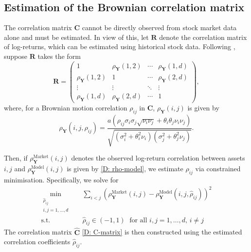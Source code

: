\subsection{Estimation of the Brownian correlation matrix}
The correlation matrix $\mathbf{C}$ cannot be directly observed from stock market data alone and must be estimated. In view of this, let $\mathbf{R}$ denote the correlation matrix of log-returns, which can be estimated using historical stock data. Following \cite{LUCIANO20101937, Luciano02072016}, suppose $\mathbf R$ takes the form
\begin{equation}
    \mathbf{R} =
    \begin{pmatrix}
        1 & \rho_{\mathbf{Y}}(1,2) & \cdots & \rho_{\mathbf{Y}}(1,d) \\
        \rho_{\mathbf{Y}}(1,2) & 1 & \cdots & \rho_{\mathbf{Y}}(2,d) \\
        \vdots & \vdots & \ddots & \vdots \\
        \rho_{\mathbf{Y}}(1,d) & \rho_{\mathbf{Y}}(2,d) & \cdots & 1
    \end{pmatrix},
    \label{D: R-matrix}
\end{equation}
where, for a Brownian motion correlation $\rho_{ij}$ in $\mathbf C$, $\rho_{\mathbf{Y}}(i,j)$ is given by
\begin{equation}
    \rho_{\mathbf{Y}}(i,j, \rho_{ij}) = \frac{a \left(\rho_{ij} \sigma_i \sigma_j \sqrt{\nu_i \nu_j} + \theta_i \theta_j \nu_i \nu_j\right)}{\sqrt{(\sigma_i^2 + \theta_i^2 \nu_i)(\sigma_j^2 + \theta_j^2 \nu_j)}}.
    \label{D: rho-model}
\end{equation}

Then, if $ \rho^{\text{Market}}_{\mathbf{Y}}(i,j)$ denotes the observed log-return correlation between assets $i, j$ and $\rho^{\text{Model}}_{\mathbf{Y}}(i,j)$ is given by \eqref{D: rho-model}, we estimate $\rho_{ij}$ via constrained minimisation. Specifically, we solve for
\begin{equation}
    \begin{aligned}
        \min_{\substack{\hat \rho_{ij} \\ i,j=1,\ldots, d}} \quad & \sum_{i<j} \left( \rho^{\text{Market}}_\mathbf{Y}(i,j) - \rho^{\text{Model}}_\mathbf{Y}(i,j,\hat \rho_{ij}) \right)^2\\
        \textrm{s.t.} \quad & \hat \rho_{ij} \in (-1,1) \; \text{ for all } i,j = 1,\ldots, d, \, i\neq j
    \end{aligned}
\end{equation}
The correlation matrix $\hat{\mathbf{C}}$ \eqref{D: C-matrix} is then constructed using the estimated correlation coefficients $\hat \rho_{ij}$. 

